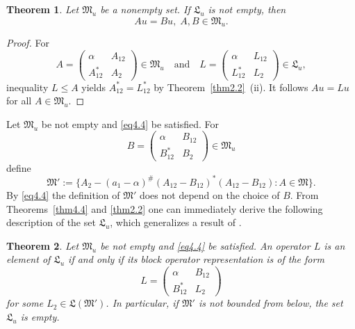 \documentclass[12pt, a4paper, reqno, twoside]{amsart}
\numberwithin{equation}{section}
\newcommand{\frakL}{\mathfrak L}
\newcommand{\frakM}{\mathfrak M}
\newtheorem{theorem}{Theorem}[section]
\theoremstyle{definition}
\theoremstyle{remark}
\theoremstyle{mystyle}
\begin{document}
\begin{theorem}
\label{thm4.5}
Let $\frakM_{u}$ be a nonempty set. If $\frakL_{u}$ is not empty, then
\begin{equation}
\label{eq4.4}
Au = Bu,\;A,B\in\frakM_{u}.
\end{equation}
\end{theorem}

\begin{proof}
For
\[
A=\begin{pmatrix}\alpha & A_{12}\\A_{12}^{\ast} & A_{2}\end{pmatrix}
\in\frakM_{u}\quad\text{and}\quad
L=\begin{pmatrix}\alpha & L_{12}\\L_{12}^{\ast} & L_{2}\end{pmatrix}
\in\frakL_{u},
\]
inequality $L\leq A$ yields $A_{12}^{\ast}=L_{12}^{\ast}$ by
Theorem~\ref{thm2.2}~(ii). It follows $Au=Lu$ for all $A\in\frakM_{u}$.
\end{proof}

Let $\frakM_{u}$ be not empty and \eqref{eq4.4} be satisfied. For
\[
B=\begin{pmatrix}\alpha & B_{12}\\B_{12}^{\ast} & B_{2}\end{pmatrix}
\in\frakM_{u}
\]
define
\begin{equation}
\label{eq4.5}
\frakM' := \{A_{2}-(a_{1}-\alpha)^{\#}(A_{12}-B_{12})^{\ast}(A_{12}-B_{12})
           : A\in\frakM\}.
\end{equation}
By \eqref{eq4.4} the definition of $\frakM'$ does not depend on the
choice of $B$. From Theorems~\ref{thm4.4} and \ref{thm2.2} one can
immediately derive the following description of the set $\frakL_{u}$,
which generalizes a result of \cite[Prop.~4.6]{Stott2016arxiv}.

\begin{theorem}
\label{thm4.6}
Let $\frakM_{u}$ be not empty and \eqref{eq4.4} be satisfied. An
operator $L$ is an element of $\frakL_{u}$ if and only if its block
operator representation is of the form
\begin{equation}
\label{eq4.6}
L=\begin{pmatrix}\alpha & B_{12}\\B_{12}^{\ast} & L_{2}\end{pmatrix}
\end{equation}
for some $L_{2}\in\frakL(\frakM')$. In particular, if $\frakM'$ is not
bounded from below, the set $\frakL_{u}$ is empty.
\end{theorem}
\end{document}
